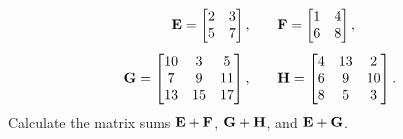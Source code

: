 \documentclass[a4paper,oneside,12pt]{article}
\begin{document}
\begin{problem}
\begin{packedenum}
\begin{equation}
    \begin{aligned}
    \textbf{E}
    =
    \begin{bmatrix}
    2 & 3 \\
    5 & 7
    \end{bmatrix},
    &\qquad
    \textbf{F}
    =
    \begin{bmatrix}
    1 & 4 \\
    6 & 8
    \end{bmatrix}, \\[4pt]
    \textbf{G}
    =
    \begin{bmatrix}
    10 & 3  & 5  \\
    7  & 9  & 11 \\
    13 & 15 & 17
    \end{bmatrix},
    &\qquad
    \textbf{H}
    =
    \begin{bmatrix}
    4 & 13 & 2  \\
    6 & 9  & 10 \\
    8 & 5  & 3
    \end{bmatrix}.
    \end{aligned}
    \end{equation}
    Calculate the matrix sums $\textbf{E} + \textbf{F}$, $\textbf{G} + \textbf{H}$, and
    $\textbf{E} + \textbf{G}$.


\end{packedenum}
\end{problem}
\end{document}

